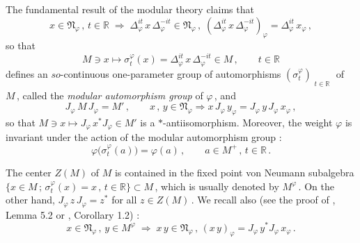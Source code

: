 \documentclass[reqno]{amsart}
\theoremstyle{definition}
\theoremstyle{remark}
\numberwithin{equation}{section}
\theoremstyle{plain}
\begin{document}
The fundamental result of the modular theory claims that
\begin{equation}\label{delta}
x\in \mathfrak N_\varphi\, ,\, t\in \mathbb R\;\Longrightarrow\;
\Delta_\varphi^{it}\, x\,\Delta_\varphi^{-it}\in \mathfrak N_\varphi
\, ,\; (\Delta_\varphi^{it}\, x\,\Delta_\varphi^{-it})_\varphi
=\Delta_\varphi^{it}\, x_\varphi\, ,
\end{equation}
so that
\begin{equation}\label{sigma}
M\ni x\longmapsto \sigma^\varphi_t (x) =\Delta_\varphi^{it}\, x\,
\Delta_\varphi^{-it}\in M\, ,\qquad t\in \mathbb R
\end{equation}
defines an $so$-continuous one-parameter group of automorphisms
$(\sigma^\varphi_t)_{\substack{{}\\ t\in \mathbb R}}$ of $M\,$,
called the \emph{modular automorphism group} of $\varphi\,$, and
\begin{equation}\label{j}
J_\varphi\, M\, J_\varphi =M'\, ,\qquad
x\, ,\, y\in \mathfrak N_\varphi \Longrightarrow
x\, J_\varphi\, y_\varphi =J_\varphi\, y\, J_\varphi\, x_\varphi\, ,
\end{equation}
so that $M\ni x\longmapsto J_\varphi\, x^* J_\varphi\in M'$ is
a $*$-antiisomorphism. Moreover, the weight $\varphi$ is invariant
under the action of the modular automorphism group :
\begin{equation}\label{inv}
\varphi\big( \sigma^\varphi_t (a)\big) =\varphi (a)\, ,\qquad
a\in M^+\, ,\, t\in\mathbb R\, .
\end{equation}

The center $Z(M)$ of $M$ is contained in the fixed point von
Neumann subalgebra $\{ x\in M\, ;\,\sigma^\varphi_t (x) =
x\, ,\, t\in\mathbb R \}\subset M\,$, which is usually denoted
by $M^\varphi\,$. On the other hand, $J_\varphi\, z\, J_\varphi
=z^*$ for all $z\in Z(M)\,$. We recall also (see the proof of
\cite{P-T}, Lemma 5.2 or \cite{Z3}, Corollary 1.2) :
\begin{equation}\label{right-mult}
x\in\mathfrak N_\varphi\, ,\, y\in M^\varphi\;\Longrightarrow\;
x\, y\in\mathfrak N_\varphi\, ,\, (x\, y)_\varphi =J_\varphi\,
y^* J_\varphi\, x_\varphi\, .
\end{equation}
\end{document}
